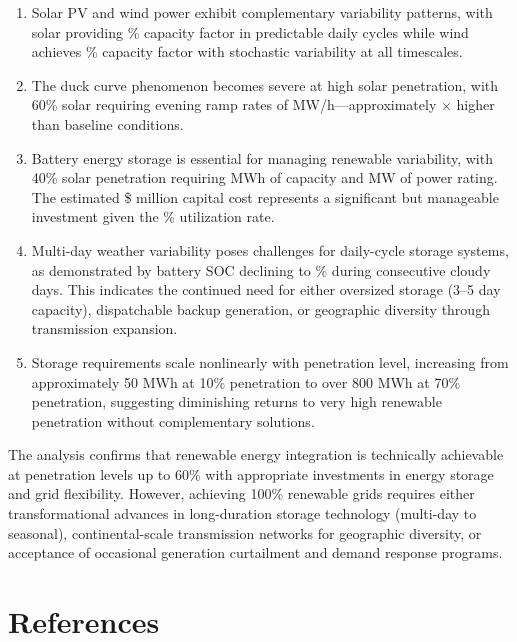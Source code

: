 \documentclass[11pt,a4paper]{article}
\begin{document}
\begin{enumerate}
\item Solar PV and wind power exhibit complementary variability patterns, with solar providing
\% capacity factor in predictable daily cycles while wind achieves
\% capacity factor with stochastic variability at all timescales.

\item The duck curve phenomenon becomes severe at high solar penetration, with 60\% solar requiring
evening ramp rates of  MW/h—approximately $\times$
higher than baseline conditions.

\item Battery energy storage is essential for managing renewable variability, with 40\% solar
penetration requiring  MWh of capacity and 
MW of power rating. The estimated \$ million capital cost
represents a significant but manageable investment given the \%
utilization rate.

\item Multi-day weather variability poses challenges for daily-cycle storage systems, as demonstrated
by battery SOC declining to \% during consecutive cloudy days. This
indicates the continued need for either oversized storage (3--5 day capacity), dispatchable backup
generation, or geographic diversity through transmission expansion.

\item Storage requirements scale nonlinearly with penetration level, increasing from approximately
50 MWh at 10\% penetration to over 800 MWh at 70\% penetration, suggesting diminishing returns
to very high renewable penetration without complementary solutions.
\end{enumerate}

The analysis confirms that renewable energy integration is technically achievable at penetration
levels up to 60\% with appropriate investments in energy storage and grid flexibility. However,
achieving 100\% renewable grids requires either transformational advances in long-duration storage
technology (multi-day to seasonal), continental-scale transmission networks for geographic
diversity, or acceptance of occasional generation curtailment and demand response programs.

\section*{References}
\end{document}
